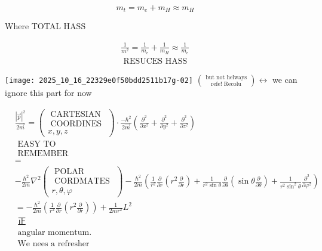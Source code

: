$$
m_{t}=m_{e}+m_{H} \approx m_{H}
$$

Where TOTAL HASS

$$
\begin{array}{r}
\frac{1}{m^{2}}=\frac{1}{m_{e}}+\frac{1}{m_{H}} \approx \frac{1}{m_{e}} \\
\text { RESUCES HASS }
\end{array}
$$

\texttt{[image: 2025\_10\_16\_22329e0f50bdd2511b17g-02]} $\binom{\text { but not helways }}{\text { refe! Recolu }} \longleftrightarrow$ we can ignore this part for now

$$
\begin{aligned}
& \frac{|\vec{p}|^{2}}{2 \vec{m}}=\left(\begin{array}{c}
\text { CARTESIAN } \\
\text { COORDINES } \\
x, y, z
\end{array}\right) \cdot \frac{-\hbar^{2}}{2 \vec{m}}\left(\frac{\partial^{2}}{\partial x^{2}}+\frac{\partial^{2}}{\partial y^{2}}+\frac{\partial^{2}}{\partial z^{2}}\right) \\
& \text { EASY TO } \\
& \text { REMEMBER } \\
& = \\
& -\frac{\hbar^{2}}{2 m} \nabla^{2}\left(\begin{array}{c}
\text { POLAR } \\
\text { CORDMATES } \\
r, \theta, \varphi
\end{array}\right)-\frac{\hbar^{2}}{2 m}\left(\frac{1}{r^{2}} \frac{\partial}{\partial r}\left(r^{2} \frac{\partial}{\partial r}\right)+\frac{1}{r^{2} \sin \theta} \frac{\partial}{\partial \theta}\left(\sin \theta \frac{\partial}{\partial \theta}\right)+\frac{1}{r^{2} \sin ^{2} \theta} \frac{\partial^{2}}{\partial \varphi^{2}}\right) \\
& =-\frac{\hbar^{2}}{2 m}\left(\frac{1}{r^{2}} \frac{\partial}{\partial r}\left(r^{2} \frac{\partial}{\partial r}\right)\right)+\frac{1}{2 m r^{2}} L^{2} \\
& \text { 正 } \\
& \text { angular momentum. } \\
& \text { We nees a refresher }
\end{aligned}
$$

